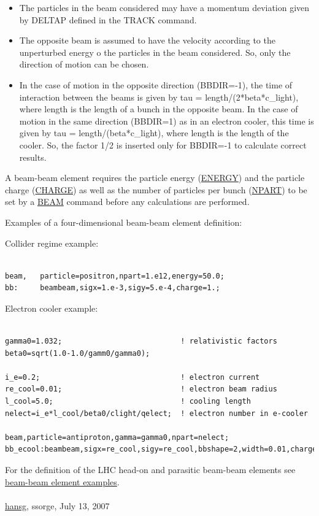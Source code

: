 \begin{itemize}
\begin{itemize}
	\item  The particles in the beam considered may have a momentum deviation 
 given by DELTAP defined in the TRACK command. 
 
	\item  The opposite beam is assumed to have the velocity according to the 
 unperturbed energy o the particles in the beam considered. 
 So, only the direction of motion can be chosen. 
 
	\item  In the case of motion in the opposite direction (BBDIR=-1), 
 the time of interaction between the beams is given by 
 tau = length/(2*beta*c\_light), where length is the length of a bunch in the 
 opposite beam. In the case of motion in the same direction 
 (BBDIR=1) as in an electron cooler, this time 
 is given by tau = length/(beta*c\_light), where length is the length of 
 the cooler. So, the factor 1/2 is inserted only for BBDIR=-1 to calculate 
 correct results. 
\end{itemize} 
\end{itemize}


 A beam-beam element requires the particle energy
 (\href{beam.html#energy}{ENERGY})
 and the particle charge
 (\href{beam.html#charge}{CHARGE})
 as well as the number of particles per bunch 
 (\href{beam.html#npart}{NPART})
 to be set by a \href{beam.html}{BEAM} command
 before any calculations are performed.
 


 Examples of a four-dimensional beam-beam element definition:
 


 Collider regime example:
 
\begin{verbatim}

beam,   particle=positron,npart=1.e12,energy=50.0;
bb:     beambeam,sigx=1.e-3,sigy=5.e-4,charge=1.;
\end{verbatim}


 Electron cooler example:
 
\begin{verbatim}

gamma0=1.032;                           ! relativistic factors
beta0=sqrt(1.0-1.0/gamm0/gamma0);

i_e=0.2;                                ! electron current
re_cool=0.01;                           ! electron beam radius
l_cool=5.0;                             ! cooling length
nelect=i_e*l_cool/beta0/clight/qelect;  ! electron number in e-cooler

beam,particle=antiproton,gamma=gamma0,npart=nelect; 
bb_ecool:beambeam,sigx=re_cool,sigy=re_cool,bbshape=2,width=0.01,charge=-1,bbdir=1;
\end{verbatim}


 For the definition of the LHC head-on and parasitic beam-beam
 elements see 
 \href{../control/foot.html#macro}{beam-beam element examples}.
 \\
 \\
 \href{http://www.cern.ch/Hans.Grote/hansg_sign.html}{hansg}, ssorge, 
 July 13, 2007
 

